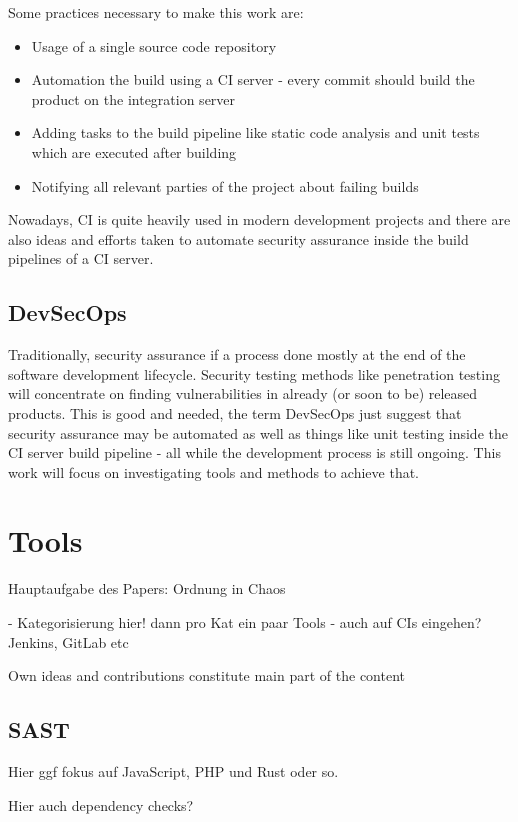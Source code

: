 \documentclass[conference]{IEEEtran}
\begin{document}
Some practices necessary to make this work are: 

\begin{itemize}
	\item Usage of a single source code repository
	\item Automation the build using a CI server - every commit should build the product on the integration server
	\item Adding tasks to the build pipeline like static code analysis and unit tests which are executed after building
	\item Notifying all relevant parties of the project about failing builds
\end{itemize}

Nowadays, CI is quite heavily used in modern development projects and there are also ideas and efforts taken to automate security assurance inside the build pipelines of a CI server. 

\subsection{DevSecOps}

Traditionally, security assurance if a process done mostly at the end of the software development lifecycle. Security testing methods like penetration testing will concentrate on finding vulnerabilities in already (or soon to be) released products. This is good and needed, the term DevSecOps just suggest that security assurance may be automated as well as things like unit testing inside the CI server build pipeline - all while the development process is still ongoing. This work will focus on investigating tools and methods to achieve that.


\section{Tools}
Hauptaufgabe des Papers: Ordnung in Chaos

- Kategorisierung hier! dann pro Kat ein paar Tools
- auch auf CIs eingehen? Jenkins, GitLab etc

Own ideas and contributions constitute main part of the content


\subsection{SAST}
Hier ggf fokus auf JavaScript, PHP und Rust oder so.

Hier auch dependency checks?
\end{document}
